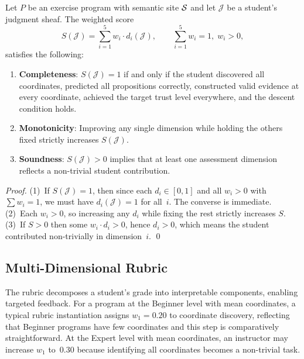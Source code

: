 \documentclass[11pt]{article}
\begin{document}
\begin{theorem}\label{thm:ped-complete}
Let $P$ be an exercise program with semantic site $\mathcal{S}$ and let
$\mathcal{J}$ be a student's judgment sheaf. The weighted score
\[
  S(\mathcal{J}) = \sum_{i=1}^{5} w_i \cdot d_i(\mathcal{J}),
  \qquad \sum_{i=1}^{5} w_i = 1,\; w_i > 0,
\]
satisfies the following:
\begin{enumerate}
  \item \textbf{Completeness}: $S(\mathcal{J}) = 1$ if and only if the
        student discovered all coordinates, predicted all propositions
        correctly, constructed valid evidence at every coordinate, achieved
        the target trust level everywhere, and the descent condition holds.
  \item \textbf{Monotonicity}: Improving any single dimension while holding
        the others fixed strictly increases $S(\mathcal{J})$.
  \item \textbf{Soundness}: $S(\mathcal{J}) > 0$ implies that at least one
        assessment dimension reflects a non-trivial student contribution.
\end{enumerate}
\end{theorem}

\begin{proof}
(1)~If $S(\mathcal{J})=1$, then since each $d_i \in [0,1]$ and all $w_i>0$
with $\sum w_i = 1$, we must have $d_i(\mathcal{J})=1$ for all~$i$. The
converse is immediate. (2)~Each $w_i > 0$, so increasing any $d_i$ while
fixing the rest strictly increases $S$. (3)~If $S > 0$ then some $w_i
\cdot d_i > 0$, hence $d_i > 0$, which means the student contributed
non-trivially in dimension~$i$. \qed
\end{proof}

\subsection{Multi-Dimensional Rubric}

The rubric decomposes a student's grade into interpretable components,
enabling targeted feedback. For a program at the Beginner level with
\ppLXVIBeginnerMeanCoords{} mean coordinates, a typical rubric
instantiation assigns $w_1 = 0.20$ to coordinate discovery, reflecting
that Beginner programs have few coordinates and this step is comparatively
straightforward. At the Expert level with \ppLXVIExpertMeanCoords{} mean
coordinates, an instructor may increase $w_1$ to~$0.30$ because
identifying all coordinates becomes a non-trivial task.
\end{document}
